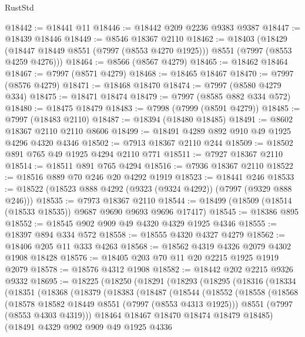 \begin{lexlean}{RustStd}
\begin{coremodule}
@18442 := @18441 @11
@18446 := @18442 @209 @2236 @9383 @9387
@18447 := @18439 @18446
@18449 := @8546 @18367 @2110
@18462 := @18403
    (@18429 (@18447 @18449 @8551 (@7997 (@8553 @4270 @1925))) @8551 (@7997 (@8553 @4259 @4276)))
@18464 := @8566 (@8567 @4279)
@18465 := @18462 @18464
@18467 := @7997 (@8571 @4279)
@18468 := @18465 @18467
@18470 := @7997 (@8576 @4279)
@18471 := @18468 @18470
@18474 := @7997 (@8580 @4279 @334)
@18475 := @18471 @18474
@18479 := @7997 (@8585 @882 @334 @572)
@18480 := @18475 @18479
@18483 := @7998 (@7999 (@8591 @4279))
@18485 := @7997 (@18483 @2110)
@18487 := @18394 (@18480 @18485)
@18491 := @8602 @18367 @2110 @2110 @8606
@18499 := @18491 @4289 @892 @910 @49 @1925 @4296 @4320 @4346
@18502 := @7913 @18367 @2110 @244
@18509 := @18502 @891 @765 @49 @1925 @4294 @2110 @771
@18511 := @7927 @18367 @2110
@18514 := @18511 @891 @765 @4294
@18516 := @7936 @18367 @2110
@18522 := @18516 @889 @70 @246 @20 @4292 @1919
@18523 := @18441 @246
@18533 := @18522 (@18523 @888 @4292 (@9323 (@9324 @4292)) (@7997 (@9329 @888 @246)))
@18535 := @7973 @18367 @2110
@18544 := @18499 (@18509 (@18514 (@18533 @18535)) @9687 @9690 @9693 @9696 @17417)
@18545 := @18386 @895
@18552 := @18545 @902 @909 @49 @4320 @4329 @1925 @4346
@18555 := @18397 @894 @334 @572
@18558 := @18555 @4320 @4327 @4279
@18562 := @18406 @205 @11 @333 @4263
@18568 := @18562 @4319 @4326 @2079 @4302 @1908 @18428
@18576 := @18405 @203 @70 @11 @20 @2215 @1925 @1919 @2079
@18578 := @18576 @4312 @1908
@18582 := @18442 @202 @2215 @9326 @9332
@18695 := @18225
    (@18250
      (@18291
        (@18293
          (@18295
            (@18316
              (@18334
                (@18351
                  (@18368
                    (@18379
                      (@18383
                        (@18487
                          (@18544
                            (@18552
                              (@18558
                                (@18568
                                  (@18578 @18582 @18449 @8551 (@7997 (@8553 @4313 @1925)))
                                  @8551
                                  (@7997 (@8553 @4303 @4319)))
                                @18464
                                @18467
                                @18470
                                @18474
                                @18479
                                @18485)
                              (@18491
                                @4329
                                @902
                                @909
                                @49
                                @1925
                                @4336

\end{coremodule}
\end{lexlean}

